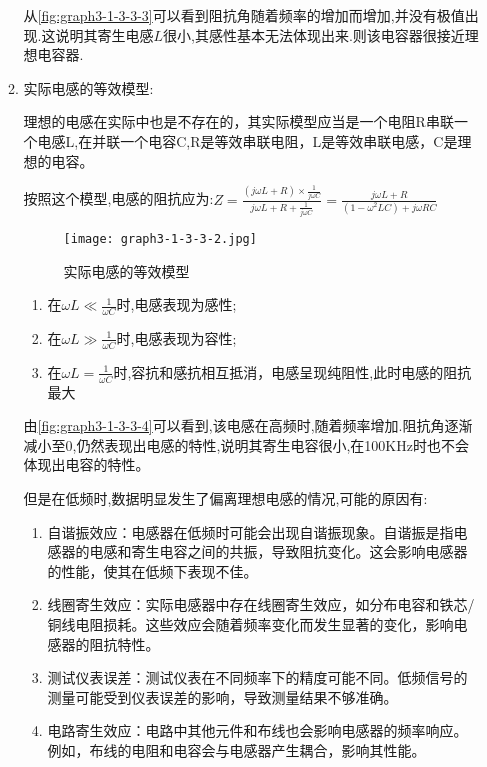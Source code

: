 \documentclass[dvipsnames, svgnames,a4paper,11pt]{article}
\begin{document}
\begin{enumerate}
\begin{enumerate}
					从\cref{fig:graph3-1-3-3-3}可以看到阻抗角随着频率的增加而增加,并没有极值出现.这说明其寄生电感$L$很小,其感性基本无法体现出来.则该电容器很接近理想电容器.



				\item 实际电感的等效模型:
				
					理想的电感在实际中也是不存在的，其实际模型应当是一个电阻R串联一个电感L,在并联一个电容C,R是等效串联电阻，L是等效串联电感，C是理想的电容。

					按照这个模型,电感的阻抗应为:$Z=\frac{(j\omega L+R)\times\frac{1}{j\omega C}}{j\omega L+R+\frac{1}{j\omega C}}=\frac{j\omega L+R}{(1-\omega^2LC)+j\omega RC}$

					\begin{figure}[htbp]
						\centering
						\texttt{[image: graph3-1-3-3-2.jpg]}
						\caption{实际电感的等效模型}
						\label{fig:graph3-1-3-3-2}
					\end{figure}

					\begin{enumerate}
						\item 在$\omega L\ll \frac{1}{\omega C}$时,电感表现为感性;
						\item 在$\omega L\gg \frac{1}{\omega C}$时,电感表现为容性;
						\item 在$\omega L =  \frac{1}{\omega C}$时,容抗和感抗相互抵消，电感呈现纯阻性,此时电感的阻抗最大
					\end{enumerate}

					由\cref{fig:graph3-1-3-3-4}可以看到,该电感在高频时,随着频率增加.阻抗角逐渐减小至0,仍然表现出电感的特性,说明其寄生电容很小,在100KHz时也不会体现出电容的特性。

					但是在低频时,数据明显发生了偏离理想电感的情况,可能的原因有:
						\begin{enumerate}
							\item 自谐振效应：电感器在低频时可能会出现自谐振现象。自谐振是指电感器的电感和寄生电容之间的共振，导致阻抗变化。这会影响电感器的性能，使其在低频下表现不佳。
							\item 线圈寄生效应：实际电感器中存在线圈寄生效应，如分布电容和铁芯/铜线电阻损耗。这些效应会随着频率变化而发生显著的变化，影响电感器的阻抗特性。
							\item 测试仪表误差：测试仪表在不同频率下的精度可能不同。低频信号的测量可能受到仪表误差的影响，导致测量结果不够准确。
							\item 电路寄生效应：电路中其他元件和布线也会影响电感器的频率响应。例如，布线的电阻和电容会与电感器产生耦合，影响其性能。
						\end{enumerate}



\end{enumerate}
\end{enumerate}
\end{document}
